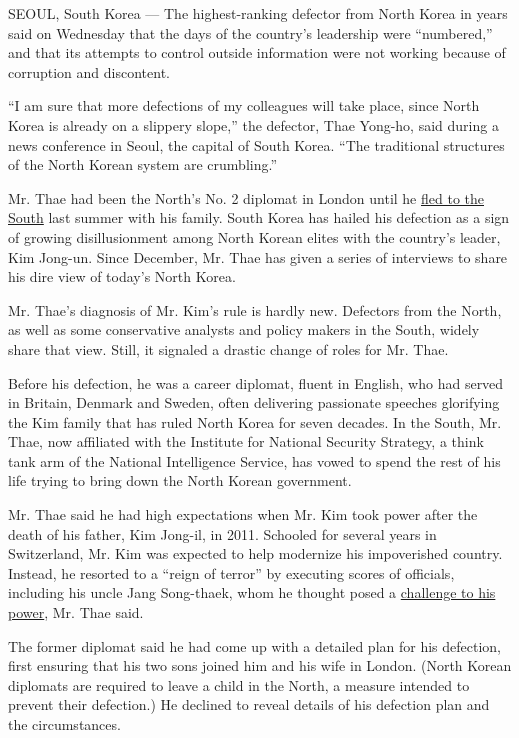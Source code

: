 SEOUL, South Korea --- The highest-ranking defector from North Korea in
years said on Wednesday that the days of the country's leadership were
``numbered,'' and that its attempts to control outside information were
not working because of corruption and discontent.

``I am sure that more defections of my colleagues will take place, since
North Korea is already on a slippery slope,'' the defector, Thae
Yong-ho, said during a news conference in Seoul, the capital of South
Korea. ``The traditional structures of the North Korean system are
crumbling.''

Mr. Thae had been the North's No. 2 diplomat in London until he
\href{https://www.nytimes.com/2016/08/18/world/asia/north-korea-defector-thae-yong-ho-britain.html}{fled
to the South} last summer with his family. South Korea has hailed his
defection as a sign of growing disillusionment among North Korean elites
with the country's leader, Kim Jong-un. Since December, Mr. Thae has
given a series of interviews to share his dire view of today's North
Korea.

Mr. Thae's diagnosis of Mr. Kim's rule is hardly new. Defectors from the
North, as well as some conservative analysts and policy makers in the
South, widely share that view. Still, it signaled a drastic change of
roles for Mr. Thae.

Before his defection, he was a career diplomat, fluent in English, who
had served in Britain, Denmark and Sweden, often delivering passionate
speeches glorifying the Kim family that has ruled North Korea for seven
decades. In the South, Mr. Thae, now affiliated with the Institute for
National Security Strategy, a think tank arm of the National
Intelligence Service, has vowed to spend the rest of his life trying to
bring down the North Korean government.

Mr. Thae said he had high expectations when Mr. Kim took power after the
death of his father, Kim Jong-il, in 2011. Schooled for several years in
Switzerland, Mr. Kim was expected to help modernize his impoverished
country. Instead, he resorted to a ``reign of terror'' by executing
scores of officials, including his uncle Jang Song-thaek, whom he
thought posed a
\href{http://www.nytimes.com/2013/12/14/world/asia/execution-raises-doubts-about-kims-grip-on-north-korea.html}{challenge
to his power}, Mr. Thae said.

The former diplomat said he had come up with a detailed plan for his
defection, first ensuring that his two sons joined him and his wife in
London. (North Korean diplomats are required to leave a child in the
North, a measure intended to prevent their defection.) He declined to
reveal details of his defection plan and the circumstances.

